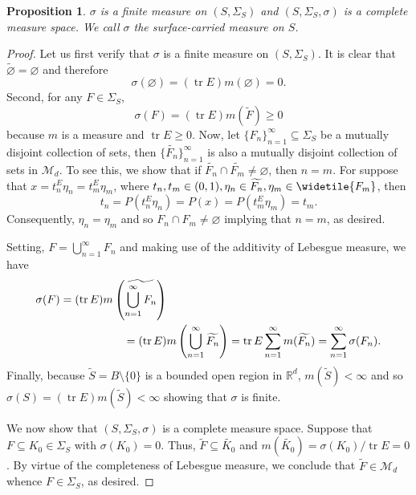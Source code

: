 \documentclass{article}
\theoremstyle{theorem}
\newtheorem{proposition}[theorem]{Proposition}
\theoremstyle{remark}
\newcommand\tr{\operatorname{tr}}
\begin{document}
\begin{proposition}
$\sigma$ is a finite measure on $(S,\Sigma_S)$ and $(S,\Sigma_S,\sigma)$ is a complete measure space. We call $\sigma$ the surface-carried measure on $S$.
\end{proposition}
\begin{proof}

\noindent Let us first verify that $\sigma$ is a finite measure on $(S,\Sigma_S)$. It is clear that $\widetilde{\varnothing}=\varnothing$ and therefore
\begin{equation*}
\sigma(\varnothing)=(\tr E)m(\varnothing)=0.
\end{equation*}
Second, for any $F \in \Sigma_S$, 
\begin{equation*}\sigma(F) = (\tr E) m(\tilde{F}) \geq 0
\end{equation*}
because $m$ is a measure and $\tr E\geq 0$. Now, let $\{ F_n  \}^\infty_{n=1} \subseteq \Sigma_S $ be a mutually disjoint collection of sets, then $\{ \widetilde{F_n} \}_{n=1}^\infty$ is also a mutually disjoint
collection of sets in $\mathcal{M}_d$. To see this, we show that if  $\widetilde{F_n} \cap \widetilde{F_m}\neq \varnothing$, then $n=m$. For suppose that $x = t_n^E \eta_n = t_m^E \eta_m$, where $t_n,t_m \in (0,1), \eta_n \in \widetilde{F_n}, \eta_m \in \widetile{F_m}$, then
\begin{equation*}
    t_n = P(t_n^E \eta_n) = P(x) = P(t_m^E \eta_m) = t_m.
\end{equation*}
Consequently, $\eta_n = \eta_m$ and so $F_n\cap F_m\neq \varnothing$ implying that $n=m$, as desired.

Setting, $F=\bigcup_{n=1}^\infty F_n$ and making use of the additivity of Lebesgue measure, we have
\begin{eqnarray*}
    \lefteqn{\sigma(F)
    = (\tr E)m\left( \widetilde{\bigcup^\infty_{n=1} F_n } \right)}\\
    &&\hspace{2.5cm}= (\tr E)m\left( \bigcup^\infty_{n=1}\widetilde{F_n} \right)
    = \tr E \sum^\infty_{n=1} m(\widetilde{F_n})
    = \sum^\infty_{n=1}\sigma(F_n).
\end{eqnarray*}
Finally, because $\widetilde{S} = B\setminus\{ 0 \}$ is a bounded open region in $\mathbb{R}^d$, $m(\widetilde{S}) < \infty$ and so $\sigma(S) = (\tr E) m(\widetilde{S}) < \infty$ showing that $\sigma$ is finite.
    
   We now show that $(S,\Sigma_S,\sigma)$ is a complete measure space. Suppose that $F\subseteq K_0\in \Sigma_S$ with $\sigma(K_0)=0$. Thus, $\widetilde{F}\subseteq \widetilde{K_0}$ and $m(\widetilde{K_0})=\sigma(K_0)/\tr E =0$. By virtue of the completeness of Lebesgue measure, we conclude that $\widetilde F\in \mathcal{M}_d$ whence $F\in\Sigma_S$, as desired.
\end{proof}
\end{document}
